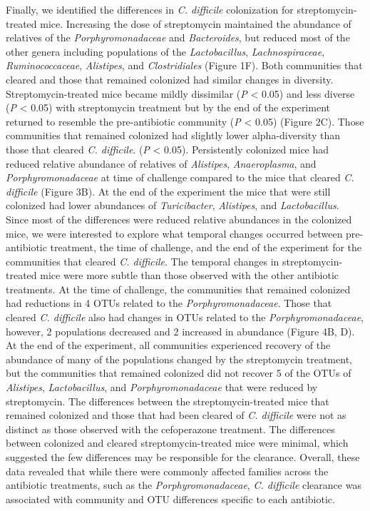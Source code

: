 \documentclass[11pt,]{article}
\begin{document}
Finally, we identified the differences in \emph{C. difficile}
colonization for streptomycin-treated mice. Increasing the dose of
streptomycin maintained the abundance of relatives of the
\emph{Porphyromonadaceae} and \emph{Bacteroides}, but reduced most of
the other genera including populations of the \emph{Lactobacillus},
\emph{Lachnospiraceae}, \emph{Ruminococcaceae}, \emph{Alistipes}, and
\emph{Clostridiales} (Figure 1F). Both communities that cleared and
those that remained colonized had similar changes in diversity.
Streptomycin-treated mice became mildly dissimilar (\emph{P} \textless{}
0.05) and less diverse (\emph{P} \textless{} 0.05) with streptomycin
treatment but by the end of the experiment returned to resemble the
pre-antibiotic community (\emph{P} \textless{} 0.05) (Figure 2C). Those
communities that remained colonized had slightly lower alpha-diversity
than those that cleared \emph{C. difficile}. (\emph{P} \textless{}
0.05). Persistently colonized mice had reduced relative abundance of
relatives of \emph{Alistipes}, \emph{Anaeroplasma}, and
\emph{Porphyromonadaceae} at time of challenge compared to the mice that
cleared \emph{C. difficile} (Figure 3B). At the end of the experiment
the mice that were still colonized had lower abundances of
\emph{Turicibacter}, \emph{Alistipes}, and \emph{Lactobacillus}. Since
most of the differences were reduced relative abundances in the
colonized mice, we were interested to explore what temporal changes
occurred between pre-antibiotic treatment, the time of challenge, and
the end of the experiment for the communities that cleared \emph{C.
difficile}. The temporal changes in streptomycin-treated mice were more
subtle than those observed with the other antibiotic treatments. At the
time of challenge, the communities that remained colonized had
reductions in 4 OTUs related to the \emph{Porphyromonadaceae}. Those
that cleared \emph{C. difficile} also had changes in OTUs related to the
\emph{Porphyromonadaceae}, however, 2 populations decreased and 2
increased in abundance (Figure 4B, D). At the end of the experiment, all
communities experienced recovery of the abundance of many of the
populations changed by the streptomycin treatment, but the communities
that remained colonized did not recover 5 of the OTUs of
\emph{Alistipes}, \emph{Lactobacillus}, and \emph{Porphyromonadaceae}
that were reduced by streptomycin. The differences between the
streptomycin-treated mice that remained colonized and those that had
been cleared of \emph{C. difficile} were not as distinct as those
observed with the cefoperazone treatment. The differences between
colonized and cleared streptomycin-treated mice were minimal, which
suggested the few differences may be responsible for the clearance.
Overall, these data revealed that while there were commonly affected
families across the antibiotic treatments, such as the
\emph{Porphyromonadaceae}, \emph{C. difficile} clearance was associated
with community and OTU differences specific to each antibiotic.
\end{document}
